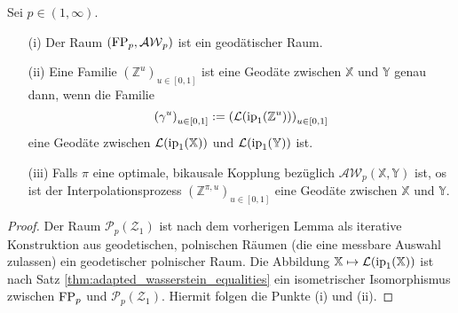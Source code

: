 \begin{theorem}
    Sei $p \in (1, \infty)$.
\begin{enumerate}
    \item[(i)] Der Raum $(\operatorname{FP}_p, \mathcal{AW}_p)$ ist ein geodätischer Raum.
    \item[(ii)] Eine Familie $(\mathbb{Z}^u)_{u \in [0,1]}$ ist eine Geodäte zwischen $\mathbb{X}$ und $\mathbb{Y}$ genau dann, wenn die Familie 
    $$\left( \gamma^u \right)_{u \in [0,1]} := \left( \mathcal{L}(\operatorname{ip}_1(\mathbb{Z}^u)) \right)_{u \in [0,1]}$$
    eine Geodäte zwischen $\mathcal{L}(\operatorname{ip}_1(\mathbb{X}))$ und $\mathcal{L}(\operatorname{ip}_1(\mathbb{Y}))$ ist.
    \item[(iii)] Falls $\pi$ eine optimale, bikausale Kopplung bezüglich $\mathcal{AW}_p(\mathbb{X,Y})$ ist, os ist der Interpolationsprozess $\left(\mathbb{Z}^{\pi, u}\right)_{u \in [0,1]}$ eine Geodäte zwischen $\mathbb{X}$ und $\mathbb{Y}$.
\end{enumerate}
\end{theorem}
\begin{proof}
    Der Raum $\mathcal{P}_p(\mathcal{Z}_1)$ ist nach dem vorherigen Lemma als iterative Konstruktion aus geodetischen, polnischen Räumen (die eine messbare Auswahl zulassen) ein geodetischer polnischer Raum. Die Abbildung $\mathbb{X} \mapsto \mathcal{L}(\operatorname{ip}_1(\mathbb{X}))$ ist nach Satz \ref{thm:adapted_wasserstein_equalities} ein isometrischer Isomorphismus zwischen $\operatorname{FP}_p$ und $\mathcal{P}_p(\mathcal{Z}_1)$. Hiermit folgen die Punkte (i) und (ii).
\end{proof}
